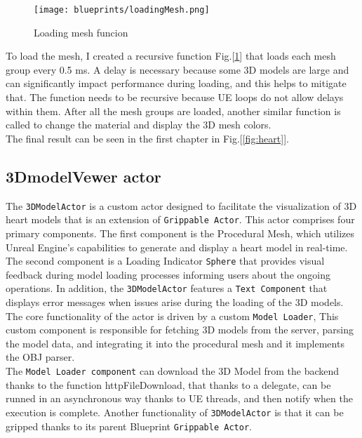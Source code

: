 

\begin{figure}[ht]
    \centering
    \texttt{[image: blueprints/loadingMesh.png]}
    \caption{Loading mesh funcion}
    \label{fig:loadingMesh}
\end{figure}
\noindent
To load the mesh, I created a recursive function Fig.[\ref{fig:loadingMesh}] that loads each mesh group every 0.5 ms. A delay is necessary because some 3D models are large and can significantly impact performance during loading, and this helps to mitigate that. The function needs to be recursive because \ac{UE} loops do not allow delays within them.
After all the mesh groups are loaded, another similar function is called to change the material and display the 3D mesh colors.\\
The final result can be seen in the first chapter in Fig.[\ref{fig:heart}].
\subsection{3DmodelVewer actor}
\noindent
The \texttt{3DModelActor} is a custom actor designed to facilitate the visualization of 3D heart models that is an extension of \texttt{Grippable Actor}. This actor comprises four primary components. The first component is the Procedural Mesh, which utilizes Unreal Engine's capabilities to generate and display a heart model in real-time. 
The second component is a Loading Indicator \texttt{Sphere} that provides visual feedback during model loading processes informing users about the ongoing operations. In addition, the \texttt{3DModelActor} features a \texttt{Text Component} that displays error messages when issues arise during the loading of the 3D models.\\
The core functionality of the actor is driven by a custom \texttt{Model Loader}, This custom component is responsible for fetching 3D models from the server, parsing the model data, and integrating it into the procedural mesh and it implements the OBJ parser.\\
The \texttt{Model Loader component} can download the 3D Model from the backend thanks to the function httpFileDownload, that thanks to a delegate, can be runned in an asynchronous way thanks to \ac{UE} threads, and then notify when the execution is complete.
Another functionality of \texttt{3DModelActor} is that it can be gripped thanks to its parent Blueprint \texttt{Grippable Actor}.



